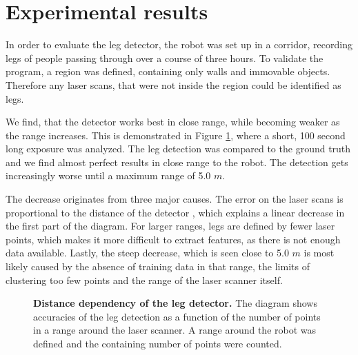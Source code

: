 \section{Experimental results}

In order to evaluate the leg detector, the robot was set up in a corridor, recording legs of people passing through over a course of three hours. To validate the program, a region was defined, containing only walls and immovable objects. Therefore any laser scans, that were not inside the region could be identified as legs.

We find, that the detector works best in close range, while becoming weaker as the range increases. This is demonstrated in Figure \ref{fig:radius_detection}, where a short, 100 second long exposure was analyzed. The leg detection was compared to the ground truth and we find almost perfect results in close range to the robot. The detection gets increasingly worse until a maximum range of 5.0 $m$.

The decrease originates from three major causes. The error on the laser scans is proportional to the distance of the detector , which explains a linear decrease in the first part of the diagram. For larger ranges, legs are defined by fewer laser points, which makes it more difficult to extract features, as there is not enough data available. Lastly, the steep decrease, which is seen close to 5.0 $m$ is most likely caused by the absence of training data in that range, the limits of clustering too few points and the range of the laser scanner itself.

\begin{figure}
	\label{fig:radius_detection}
		\normalsize
		\begin{center}
			
		\end{center}
		\caption{\textbf{Distance dependency of the leg detector.} The diagram shows accuracies of the leg detection as a function of the number of points in a range around the laser scanner. A range around the robot was defined and the containing number of points were counted.}
\end{figure}
